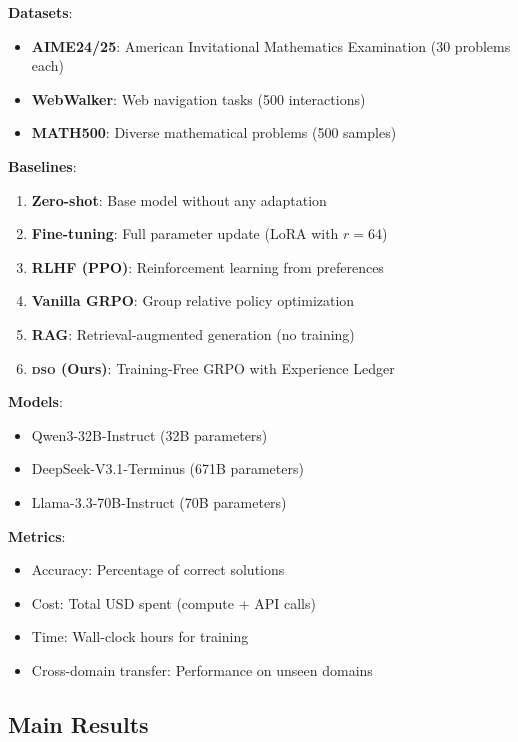 \documentclass[11pt,letterpaper]{article}
\newcommand{\DSO}{\textsc{dso}}
\begin{document}
\textbf{Datasets}:
\begin{itemize}
    \item \textbf{AIME24/25}: American Invitational Mathematics Examination (30 problems each)
    \item \textbf{WebWalker}: Web navigation tasks (500 interactions)
    \item \textbf{MATH500}: Diverse mathematical problems (500 samples)
\end{itemize}

\textbf{Baselines}:
\begin{enumerate}
    \item \textbf{Zero-shot}: Base model without any adaptation
    \item \textbf{Fine-tuning}: Full parameter update (LoRA with $r=64$)
    \item \textbf{RLHF (PPO)}: Reinforcement learning from preferences
    \item \textbf{Vanilla GRPO}: Group relative policy optimization
    \item \textbf{RAG}: Retrieval-augmented generation (no training)
    \item \textbf{\DSO{} (Ours)}: Training-Free GRPO with Experience Ledger
\end{enumerate}

\textbf{Models}:
\begin{itemize}
    \item Qwen3-32B-Instruct (32B parameters)
    \item DeepSeek-V3.1-Terminus (671B parameters)
    \item Llama-3.3-70B-Instruct (70B parameters)
\end{itemize}

\textbf{Metrics}:
\begin{itemize}
    \item Accuracy: Percentage of correct solutions
    \item Cost: Total USD spent (compute + API calls)
    \item Time: Wall-clock hours for training
    \item Cross-domain transfer: Performance on unseen domains
\end{itemize}

\subsection{Main Results}
\end{document}
